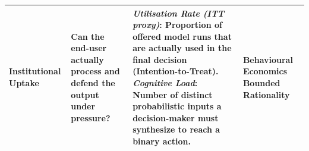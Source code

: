 \begin{table}[htbp]
\begin{tabularx}{\textwidth}{@{} l l X l @{}}
\midrule

\textbf{Institutional Uptake} & Can the end-user actually process and defend the output under pressure? & 
\textit{Utilisation Rate (ITT proxy)}: Proportion of offered model runs that are actually used in the final decision (Intention-to-Treat). \newline
\textit{Cognitive Load}: Number of distinct probabilistic inputs a decision-maker must synthesize to reach a binary action. & 
Behavioural Economics \newline \newline Bounded Rationality \\

\bottomrule
\end{tabularx}
\end{table}